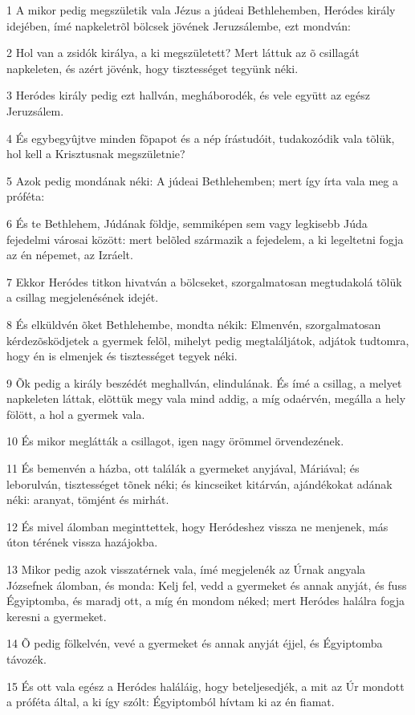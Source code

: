 \par 1 A mikor pedig megszületik vala Jézus a júdeai Bethlehemben, Heródes király idejében, ímé napkeletrõl bölcsek jövének Jeruzsálembe, ezt mondván:
\par 2 Hol van a zsidók királya, a ki megszületett? Mert láttuk az õ csillagát napkeleten, és azért jövénk, hogy tisztességet tegyünk néki.
\par 3 Heródes király pedig ezt hallván, megháborodék, és vele együtt az egész Jeruzsálem.
\par 4 És egybegyûjtve minden fõpapot és a nép írástudóit, tudakozódik vala tõlük, hol kell a Krisztusnak megszületnie?
\par 5 Azok pedig mondának néki: A júdeai Bethlehemben; mert így írta vala meg a próféta:
\par 6 És te Bethlehem, Júdának földje, semmiképen sem vagy legkisebb Júda fejedelmi városai között: mert belõled származik a fejedelem, a ki legeltetni fogja az én népemet, az Izráelt.
\par 7 Ekkor Heródes titkon hivatván a bölcseket, szorgalmatosan megtudakolá tõlük a csillag megjelenésének idejét.
\par 8 És elküldvén õket Bethlehembe, mondta nékik: Elmenvén, szorgalmatosan kérdezõsködjetek a gyermek felõl, mihelyt pedig megtaláljátok, adjátok tudtomra, hogy én is elmenjek és tisztességet tegyek néki.
\par 9 Õk pedig a király beszédét meghallván, elindulának. És ímé a csillag, a melyet napkeleten láttak, elõttük megy vala mind addig, a míg odaérvén, megálla a hely fölött, a hol a gyermek vala.
\par 10 És mikor meglátták a csillagot, igen nagy örömmel örvendezének.
\par 11 És bemenvén a házba, ott találák a gyermeket anyjával, Máriával; és leborulván, tisztességet tõnek néki; és kincseiket kitárván, ajándékokat adának néki: aranyat, tömjént és mirhát.
\par 12 És mivel álomban meginttettek, hogy Heródeshez vissza ne menjenek, más úton térének vissza hazájokba.
\par 13 Mikor pedig azok visszatérnek vala, ímé megjelenék az Úrnak angyala Józsefnek álomban, és monda: Kelj fel, vedd a gyermeket és annak anyját, és fuss Égyiptomba, és maradj ott, a míg én mondom néked; mert Heródes halálra fogja keresni a gyermeket.
\par 14 Õ pedig fölkelvén, vevé a gyermeket és annak anyját éjjel, és Égyiptomba távozék.
\par 15 És ott vala egész a Heródes haláláig, hogy beteljesedjék, a mit az Úr mondott a próféta által, a ki így szólt: Égyiptomból hívtam ki az én fiamat.
